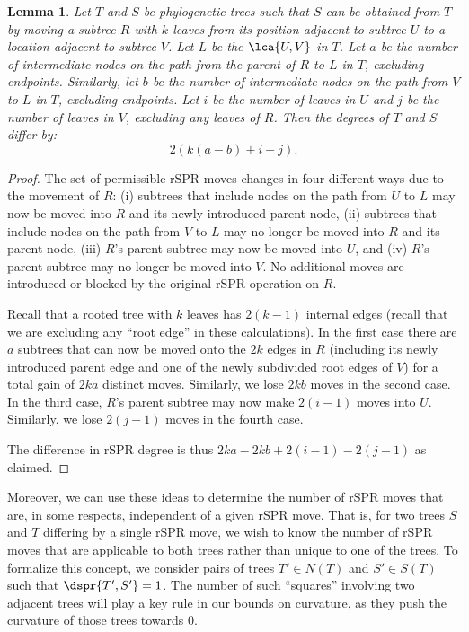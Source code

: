 \documentclass[11pt,onecolumn,conference]{IEEEtran}
\newtheorem{lemma}[theorem]{Lemma}
\begin{document}
\begin{lemma}
\label{lem:degree_change}
Let $T$ and $S$ be phylogenetic trees such that $S$ can be obtained from $T$ by moving a subtree $R$ with $k$ leaves from its position adjacent to subtree $U$ to a location adjacent to subtree $V$.
Let $L$ be the $\lca{U,V}$ in $T$.
Let $a$ be the number of intermediate nodes on the path from the parent of $R$ to $L$ in $T$, excluding endpoints.
Similarly, let $b$ be the number of intermediate nodes on the path from $V$ to $L$ in $T$, excluding endpoints.
Let $i$ be the number of leaves in $U$ and $j$ be the number of leaves in $V$, excluding any leaves of $R$.
Then the degrees of $T$ and $S$ differ by:
$$2\left(k(a-b) + i - j\right).$$

\end{lemma}
\begin{proof}
The set of permissible rSPR moves changes in four different ways due to the movement of $R$:
(i) subtrees that include nodes on the path from $U$ to $L$ may now be moved into $R$ and its newly introduced parent node,
(ii) subtrees that include nodes on the path from $V$ to $L$ may no longer be moved into $R$ and its parent node,
(iii) $R$'s parent subtree may now be moved into $U$, and
(iv) $R$'s parent subtree may no longer be moved into $V$.
No additional moves are introduced or blocked by the original rSPR operation on $R$.

Recall that a rooted tree with $k$ leaves has $2(k-1)$ internal edges (recall that we are excluding any ``root edge'' in these calculations).
In the first case there are $a$ subtrees that can now be moved onto the $2k$ edges in $R$ (including its newly introduced parent edge and one of the newly subdivided root edges of $V$) for a total gain of $2ka$ distinct moves.
Similarly, we lose $2kb$ moves in the second case.
In the third case, $R$'s parent subtree may now make $2(i-1)$ moves into $U$.
Similarly, we lose $2(j-1)$ moves in the fourth case.

The difference in rSPR degree is thus $2ka - 2kb + 2(i-1) - 2(j-1)$ as claimed.
\end{proof}

Moreover, we can use these ideas to determine the number of rSPR moves that are, in some respects, independent of a given rSPR move.
That is, for two trees $S$ and $T$ differing by a single rSPR move, we wish to know the number of rSPR moves that are applicable to both trees rather than unique to one of the trees.
To formalize this concept, we consider pairs of trees $T' \in N(T)$ and $S' \in S(T)$ such that $\dspr{T',S'} = 1$.
The number of such ``squares'' involving two adjacent trees will play a key rule in our bounds on curvature, as they push the curvature of those trees towards 0.
\end{document}
